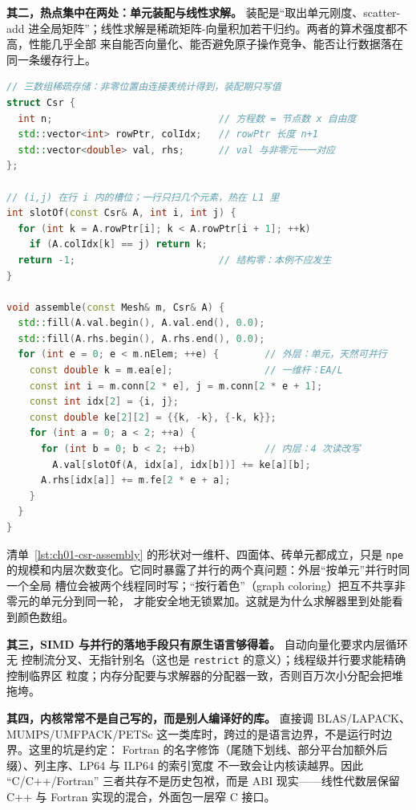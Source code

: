 \documentclass[12pt,a4paper,fontset=fandol]{ctexbook}
\newcommand{\Tp}[1]{\texttt{#1}}
\newcommand{\Bk}{\discretionary{}{}{}}
\newcommand{\Lang}[1]{\textsf{#1}}
\newcommand{\CL}{\Lang{C}}
\newcommand{\CPP}{\Lang{C++}}
\begin{document}
\textbf{其二，热点集中在两处：单元装配与线性求解。} 装配是``取出单元刚度、scatter-add
进全局矩阵''；线性求解是稀疏矩阵-向量积加若干归约。两者的算术强度都不高，性能几乎全部
来自能否向量化、能否避免原子操作竞争、能否让行数据落在同一条缓存行上。

\begin{lstlisting}[language=C++, style=cppstyle,
  caption={装配热点的通用形状：CSR 定位加 scatter-add},
  label={lst:ch01-csr-assembly}]
// 三数组稀疏存储：非零位置由连接表统计得到，装配期只写值
struct Csr {
  int n;                             // 方程数 = 节点数 x 自由度
  std::vector<int> rowPtr, colIdx;   // rowPtr 长度 n+1
  std::vector<double> val, rhs;      // val 与非零元一一对应
};

// (i,j) 在行 i 内的槽位；一行只扫几个元素，热在 L1 里
int slotOf(const Csr& A, int i, int j) {
  for (int k = A.rowPtr[i]; k < A.rowPtr[i + 1]; ++k)
    if (A.colIdx[k] == j) return k;
  return -1;                         // 结构零：本例不应发生
}

void assemble(const Mesh& m, Csr& A) {
  std::fill(A.val.begin(), A.val.end(), 0.0);
  std::fill(A.rhs.begin(), A.rhs.end(), 0.0);
  for (int e = 0; e < m.nElem; ++e) {        // 外层：单元，天然可并行
    const double k = m.ea[e];                // 一维杆：EA/L
    const int i = m.conn[2 * e], j = m.conn[2 * e + 1];
    const int idx[2] = {i, j};
    const double ke[2][2] = {{k, -k}, {-k, k}};
    for (int a = 0; a < 2; ++a) {
      for (int b = 0; b < 2; ++b)            // 内层：4 次读改写
        A.val[slotOf(A, idx[a], idx[b])] += ke[a][b];
      A.rhs[idx[a]] += m.fe[2 * e + a];
    }
  }
}
\end{lstlisting}

清单~\ref{lst:ch01-csr-assembly} 的形状对一维杆、四面体、砖单元都成立，只是 \Tp{npe}
的规模和内层次数变化。它同时暴露了并行的两个真问题：外层``按单元''并行时同一个全局
槽位会被两个线程同时写；``按行着色''（graph coloring）把互不共享非零元的单元分到同一轮，
才能安全地无锁累加。这就是为什么求解器里到处能看到颜色数组。

\textbf{其三，SIMD 与并行的落地手段只有原生语言够得着。} 自动向量化要求内层循环无
控制流分叉、无指针别名（这也是 \Tp{restrict} 的意义）；线程级并行要求能精确控制临界区
粒度；内存分配要与求解器的分配器一致，否则百万次小分配会把堆拖垮。

\textbf{其四，内核常常不是自己写的，而是别人编译好的库。} 直接调 BLAS/LAPACK、
MUMPS/UMFPACK/PETSc 这一类库时，跨过的是语言边界，不是运行时边界。这里的坑是约定：
Fortran 的名字修饰（尾随下划线、部分平台加额外后缀）、列主序、LP64 与 ILP64 的索引宽度
不一致会让内核读越界。因此 ``\CL/{\Bk}\CPP{}/Fortran'' 三者共存不是历史包袱，而是 ABI
现实——线性代数层保留 \CPP{} 与 Fortran 实现的混合，外面包一层窄 \CL{} 接口。
\end{document}
